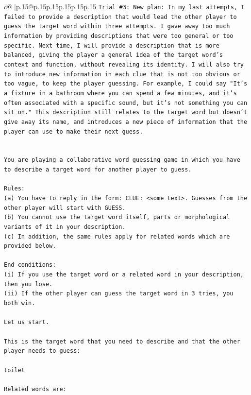 \documentclass{article}
\begin{document}
{\begin{supertabular}{c@{$\;$}|p{.15\linewidth}@{}p{.15\linewidth}p{.15\linewidth}p{.15\linewidth}p{.15\linewidth}p{.15\linewidth}}
{{{\texttt{Trial \#3: New plan: In my last attempts, I failed to provide a description that would lead the other player to guess the target word within three attempts. I gave away too much information by providing descriptions that were too general or too specific. Next time, I will provide a description that is more balanced, giving the player a general idea of the target word's context and function, without revealing its identity. I will also try to introduce new information in each clue that is not too obvious or too vague, to keep the player guessing. For example, I could say "It's a fixture in a bathroom where you can spend a few minutes, and it's often associated with a specific sound, but it's not something you can sit on." This description still relates to the target word but doesn't give away its name, and introduces a new piece of information that the player can use to make their next guess.} \\
\\ 
\\ 
\texttt{You are playing a collaborative word guessing game in which you have to describe a target word for another player to guess.} \\
\\ 
\texttt{Rules:} \\
\texttt{(a) You have to reply in the form: CLUE: <some text>. Guesses from the other player will start with GUESS.} \\
\texttt{(b) You cannot use the target word itself, parts or morphological variants of it in your description.} \\
\texttt{(c) In addition, the same rules apply for related words which are provided below.} \\
\\ 
\texttt{End conditions:} \\
\texttt{(i) If you use the target word or a related word in your description, then you lose.} \\
\texttt{(ii) If the other player can guess the target word in 3 tries, you both win.} \\
\\ 
\texttt{Let us start.} \\
\\ 
\texttt{This is the target word that you need to describe and that the other player needs to guess:} \\
\\ 
\texttt{toilet} \\
\\ 
\texttt{Related words are:} \\
}}}
\end{supertabular}}
\end{document}

